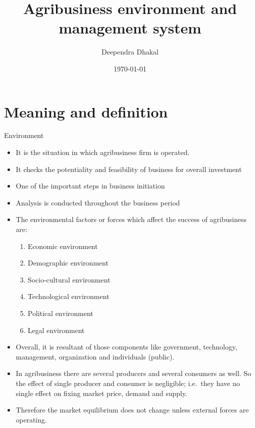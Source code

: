 \documentclass[12pt,ignorenonframetext,aspectratio=169]{beamer}
\title{\insertsectionhead}
  {
    \definecolor{white}{rgb}{0.776,0.357,0.157}
    \definecolor{iqss@orange}{rgb}{1,1,1}
    \ifnum \insertmainframenumber > \insertframenumber
    \frame{
      \frametitle{\iqsssectiontitleheader}
      \tableofcontents[currentsection]
    }
    \else
    \frame{
      \frametitle{Backup Slides}
      \tableofcontents[sectionstyle=shaded/shaded,subsectionstyle=shaded/shaded/shaded]
    }
    \fi
  }
\title[]{Agribusiness environment and management system}
\author[
        Deependra Dhakal
    ]{Deependra Dhakal}
\institute[
    ]{
    GAASC, Baitadi \and Tribhuwan University
    }
\date[
      \today
  ]{
      \today
        }
\providecommand{\tightlist}{%
  \setlength{\itemsep}{0pt}\setlength{\parskip}{0pt}}
\begin{document}
  \begin{frame}[plain]
  \titlepage
  \end{frame}



\hypertarget{meaning-and-definition}{%
\section{Meaning and definition}\label{meaning-and-definition}}

\begin{frame}{Environment}
\protect\hypertarget{environment}{}
\begin{itemize}
\tightlist
\item
  It is the situation in which agribusiness firm is operated.
\item
  It checks the potentiality and feasibility of business for overall
  investment
\item
  One of the important steps in business initiation
\item
  Analysis is conducted throughout the business period
\item
  The environmental factors or forces which affect the success of
  agribusiness are:

  \begin{enumerate}
  \tightlist
  \item
    Economic environment
  \item
    Demographic environment
  \item
    Socio-cultural environment
  \item
    Technological environment
  \item
    Political environment
  \item
    Legal environment
  \end{enumerate}
\item
  Overall, it is resultant of those components like government,
  technology, management, organization and individuals (public).
\end{itemize}
\end{frame}

\begin{frame}{}
\protect\hypertarget{section}{}
\begin{itemize}
\tightlist
\item
  In agribusiness there are several producers and several consumers as
  well. So the effect of single producer and consumer is negligible;
  i.e.~they have no single effect on fixing market price, demand and
  supply.
\item
  Therefore the market equilibrium does not change unless external
  forces are operating.
\end{itemize}
\end{frame}
\end{document}
